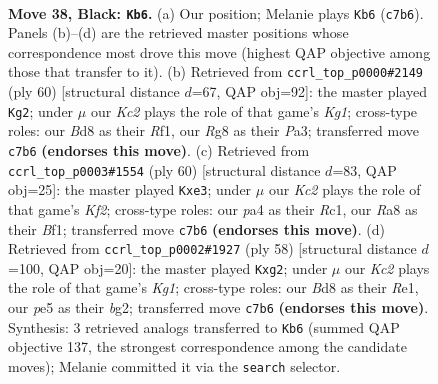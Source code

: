 \documentclass[11pt]{article}
\begin{document}
\clearpage

\begin{figure}[p]\centering
\begin{subfigure}{0.46\textwidth}\centering
\resizebox{\linewidth}{!}{%
\newchessgame
\chessboard[
  setfen={rn1b2r1/1pk2b1p/6pP/pN2Pp2/P2p4/1N4P1/1B5K/R2R4 b - - 1 38},
  showmover=false,
  pgfstyle=straightmove, color=movearrow, markmove={c7-b6}
]}
\caption{}
\end{subfigure}\hfill
\begin{subfigure}{0.46\textwidth}\centering
\resizebox{\linewidth}{!}{%
\newchessgame
\chessboard[
  setfen={2kr1r2/1pp1b3/7p/2P2p2/1P1P1Pp1/P1NRBn2/7P/5RK1 w - - 2 31},
  showmover=false,
  pgfstyle=straightmove, color=movearrow, markmove={g1-g2}
]}
\caption{}
\end{subfigure}
\\[4pt]
\begin{subfigure}{0.46\textwidth}\centering
\resizebox{\linewidth}{!}{%
\newchessgame
\chessboard[
  setfen={2r3k1/1b4pp/4pp2/8/r1P5/p3nP2/P2R1KPP/2R2B2 w - - 0 31},
  showmover=false,
  pgfstyle=straightmove, color=movearrow, markmove={f2-e3}
]}
\caption{}
\end{subfigure}\hfill
\begin{subfigure}{0.46\textwidth}\centering
\resizebox{\linewidth}{!}{%
\newchessgame
\chessboard[
  setfen={r3r1k1/1p2P1p1/1p5p/1np5/8/P1B3P1/1P4bP/2R1R1K1 w - - 1 30},
  showmover=false,
  pgfstyle=straightmove, color=movearrow, markmove={g1-g2}
]}
\caption{}
\end{subfigure}
\caption{\textbf{Move 38, Black: \texttt{Kb6}.} (a) Our position; Melanie plays \texttt{Kb6} (\texttt{c7b6}). Panels (b)--(d) are the retrieved master positions whose correspondence most drove this move (highest QAP objective among those that transfer to it). (b) Retrieved from \texttt{ccrl\_top\_p0000\#2149} (ply 60) [structural distance $d$=67, QAP obj=92]: the master played \texttt{Kg2}; under $\mu$ our \emph{Kc2} plays the role of that game's \emph{Kg1}; cross-type roles: our \emph{B}d8 as their \emph{R}f1, our \emph{R}g8 as their \emph{P}a3; transferred move \texttt{c7b6} \textbf{(endorses this move)}. (c) Retrieved from \texttt{ccrl\_top\_p0003\#1554} (ply 60) [structural distance $d$=83, QAP obj=25]: the master played \texttt{Kxe3}; under $\mu$ our \emph{Kc2} plays the role of that game's \emph{Kf2}; cross-type roles: our \emph{p}a4 as their \emph{R}c1, our \emph{R}a8 as their \emph{B}f1; transferred move \texttt{c7b6} \textbf{(endorses this move)}. (d) Retrieved from \texttt{ccrl\_top\_p0002\#1927} (ply 58) [structural distance $d$=100, QAP obj=20]: the master played \texttt{Kxg2}; under $\mu$ our \emph{Kc2} plays the role of that game's \emph{Kg1}; cross-type roles: our \emph{B}d8 as their \emph{R}e1, our \emph{p}e5 as their \emph{b}g2; transferred move \texttt{c7b6} \textbf{(endorses this move)}. Synthesis: 3 retrieved analogs transferred to \texttt{Kb6} (summed QAP objective 137, the strongest correspondence among the candidate moves); Melanie committed it via the \texttt{search} selector.}
\label{fig:thought-m75}
\end{figure}
\end{document}
